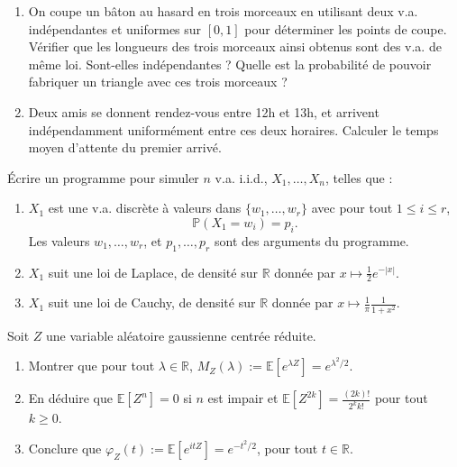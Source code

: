 \smallskip

\begin{mdframed}
\begin{exercice}
\begin{enumerate}
    \item On coupe un bâton au hasard en trois morceaux en utilisant deux v.a. indépendantes et uniformes sur $[0, 1]$ pour déterminer les points de coupe. Vérifier que les longueurs des trois morceaux ainsi obtenus sont des v.a. de même loi. Sont-elles indépendantes ? Quelle est la probabilité de pouvoir fabriquer un triangle avec ces trois morceaux ?
    \item Deux amis se donnent rendez-vous entre 12h et 13h, et arrivent indépendamment uniformément entre ces deux horaires. Calculer le temps moyen d'attente du premier arrivé.
\end{enumerate}
\end{exercice}
\end{mdframed}

\smallskip

\begin{mdframed}
\begin{exercice}
Écrire un programme pour simuler $n$ v.a. i.i.d., $X_1, \dots, X_n$, telles que :
\begin{enumerate}
    \item $X_1$ est une v.a. discrète à valeurs dans $\{w_1, \dots, w_r\}$ avec pour tout $1 \le i \le r$,
    \begin{equation*}
    \mathbb{P}(X_1 = w_i) = p_i.
    \end{equation*}
    Les valeurs $w_1, \dots, w_r$, et $p_1, \dots, p_r$ sont des arguments du programme.
    \item $X_1$ suit une loi de Laplace, de densité sur $\mathbb{R}$ donnée par $x \mapsto \frac{1}{2} e^{-|x|}$.
    \item $X_1$ suit une loi de Cauchy, de densité sur $\mathbb{R}$ donnée par $x \mapsto \frac{1}{\pi} \frac{1}{1+x^2}$.
\end{enumerate}
\end{exercice}
\end{mdframed}

\smallskip

\begin{mdframed}
\begin{exercice}
Soit $Z$ une variable aléatoire gaussienne centrée réduite.
\begin{enumerate}
    \item Montrer que pour tout $\lambda \in \mathbb{R}$, $M_Z(\lambda) := \mathbb{E}[e^{\lambda Z}] = e^{\lambda^2/2}$.
    \item En déduire que $\mathbb{E}[Z^n] = 0$ si $n$ est impair et $\mathbb{E}[Z^{2k}] = \frac{(2k)!}{2^k k!}$ pour tout $k \ge 0$.
    \item Conclure que $\varphi_Z(t) := \mathbb{E}[e^{itZ}] = e^{-t^2/2}$, pour tout $t \in \mathbb{R}$.
\end{enumerate}
\end{exercice}
\end{mdframed}

